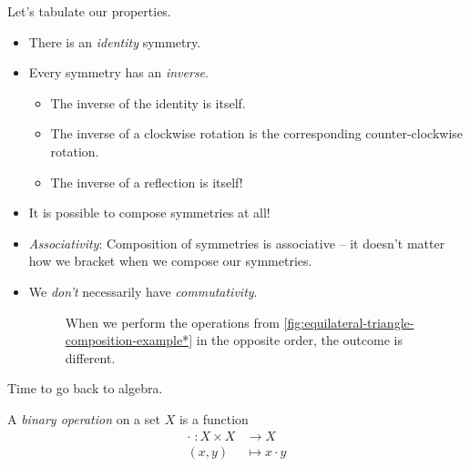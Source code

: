 \documentclass{../../template/note}
\begin{document}
    Let's tabulate our properties.
    \begin{itemize}
        \item There is an \emph{identity} symmetry.
        \item Every symmetry has an \emph{inverse}.
        \begin{itemize}
            \item The inverse of the identity is itself.
            \item The inverse of a clockwise rotation is the corresponding counter-clockwise rotation.
            \item The inverse of a reflection is itself!
        \end{itemize}
        \item It is possible to compose symmetries at all!
        \item \emph{Associativity}: Composition of symmetries is associative -- it doesn't matter how we bracket when we compose our symmetries.
        \item We \emph{don't} necessarily have \emph{commutativity}.
        
        \begin{figure}[ht]
            \centering
            \caption{When we perform the operations from \cref{fig:equilateral-triangle-composition-example*} in the opposite order, the outcome is different.}
            \label{fig:equilateral-triangle-commutativity-failure}
        \end{figure}
        
    \end{itemize}

    Time to go back to algebra.

    \begin{definition}
        A \emph{binary operation} on a set \(X\) is a function
        \begin{align*}
            \cdot\; \colon X \times X &\to X \\
            (x, y) &\mapsto x \cdot y
        \end{align*}
    \end{definition}
    
\end{document}
